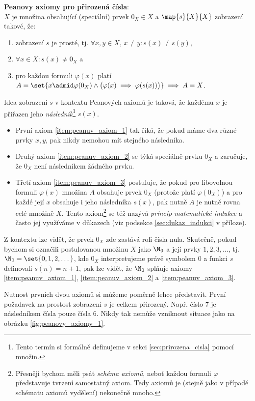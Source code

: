 \noindent\textbf{Peanovy axiomy pro přirozená čísla}:\\
$X$ je množina obsahující (speciální) prvek $0_X\in X$ a $\map{s}{X}{X}$ zobrazení takové, že:
\begin{enumerate}[label=({P}\arabic*)]
    \item\label{item:peanuv_axiom_1} zobrazení $s$ je prosté, tj. $\forall x,y\in X,\,x\neq y: s(x)\neq s(y)$,
    \item\label{item:peanuv_axiom_2} $\forall x\in X: s(x)\neq 0_X$ a
    \item\label{item:peanuv_axiom_3} pro každou formuli $\varphi(x)$ platí $A=\set{x \admid \varphi(0_X) \land \big(\varphi(x)\implies \varphi(s(x))\big)}\implies A=X$.
\end{enumerate}
Idea zobrazení $s$ v kontextu Peanových axiomů je taková, že každému $x$ je přiřazen jeho \emph{následník}\footnote{Tento termín si formálně definujeme v sekci \ref{sec:prirozena_cisla} pomocí množin.} $s(x)$.
\begin{itemize}
    \item První axiom \ref{item:peanuv_axiom_1} tak říká, že pokud máme dva různé prvky $x,y$, pak nikdy nemohou mít stejného následníka.
    \item Druhý axiom \ref{item:peanuv_axiom_2} se týká speciálně prvku $0_X$ a zaručuje, že $0_X$ není následníkem žádného prvku.
    \item Třetí axiom \ref{item:peanuv_axiom_3} postuluje, že pokud pro libovolnou formuli $\varphi(x)$ množina $A$ obsahuje prvek $0_X$ (protože platí $\varphi(0_X)$) a pro každé její $x$ obsahuje i jeho následníka $s(x)$, pak nutně $A$ je nutně rovna celé množině $X$. Tento axiom\footnote{Přesněji bychom měli psát \emph{schéma axiomů}, neboť každou formuli $\varphi$ představuje tvrzení samostatný axiom. Tedy axiomů je (stejně jako v případě schématu axiomů vydělení) nekonečně mnoho.} se též nazývá \emph{princip matematické indukce} a často jej využíváme v důkazech (viz podsekce \ref{sec:dukaz_indukci} v příloze).
\end{itemize}
Z kontextu lze vidět, že prvek $0_X$ zde zastává roli čísla nula. Skutečně, pokud bychom si označili postulovanou množinu $X$ jako $\N_0$ a její prvky $1,2,3,\dots$, tj. $\N_0=\set{0,1,2,\dots}$, kde $0_X$ interpretujeme právě symbolem $0$ a funkci $s$ definovali $s(n)=n+1$, pak lze vidět, že $\N_0$ splňuje axiomy \ref{item:peanuv_axiom_1}, \ref{item:peanuv_axiom_2} a \ref{item:peanuv_axiom_3}.\par
Nutnost prvních dvou axiomů si můžeme poměrně lehce představit. První požadavek na prostost zobrazení $s$ je celkem přirozený. Např. číslo $7$ je následníkem čísla pouze čísla $6$. Nikdy tak nemůže vzniknout situace jako na obrázku \ref{fig:peanovy_axiomy_1}.

